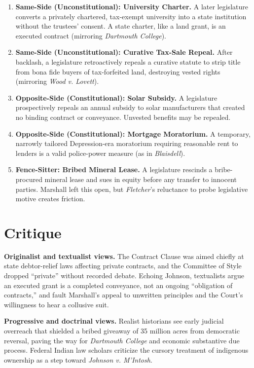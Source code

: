 \documentclass[12pt]{article}
\begin{document}
\begin{enumerate}
\item \textbf{Same-Side (Unconstitutional): University Charter.} A later legislature converts a privately chartered, tax-exempt university into a state institution without the trustees' consent. A state charter, like a land grant, is an executed contract (mirroring \textit{Dartmouth College}).
\item \textbf{Same-Side (Unconstitutional): Curative Tax-Sale Repeal.} After backlash, a legislature retroactively repeals a curative statute to strip title from bona fide buyers of tax-forfeited land, destroying vested rights (mirroring \textit{Wood v. Lovett}).
\item \textbf{Opposite-Side (Constitutional): Solar Subsidy.} A legislature prospectively repeals an annual subsidy to solar manufacturers that created no binding contract or conveyance. Unvested benefits may be repealed.
\item \textbf{Opposite-Side (Constitutional): Mortgage Moratorium.} A temporary, narrowly tailored Depression-era moratorium requiring reasonable rent to lenders is a valid police-power measure (as in \textit{Blaisdell}).
\item \textbf{Fence-Sitter: Bribed Mineral Lease.} A legislature rescinds a bribe-procured mineral lease and sues in equity before any transfer to innocent parties. Marshall left this open, but \textit{Fletcher}'s reluctance to probe legislative motive creates friction.
\end{enumerate}

\section{Critique}

\textbf{Originalist and textualist views.} The Contract Clause was aimed chiefly at state debtor-relief laws affecting private contracts, and the Committee of Style dropped ``private'' without recorded debate. Echoing Johnson, textualists argue an executed grant is a completed conveyance, not an ongoing ``obligation of contracts,'' and fault Marshall's appeal to unwritten principles and the Court's willingness to hear a collusive suit.

\textbf{Progressive and doctrinal views.} Realist historians see early judicial overreach that shielded a bribed giveaway of 35 million acres from democratic reversal, paving the way for \textit{Dartmouth College} and economic substantive due process. Federal Indian law scholars criticize the cursory treatment of indigenous ownership as a step toward \textit{Johnson v. M'Intosh}.
\end{document}
